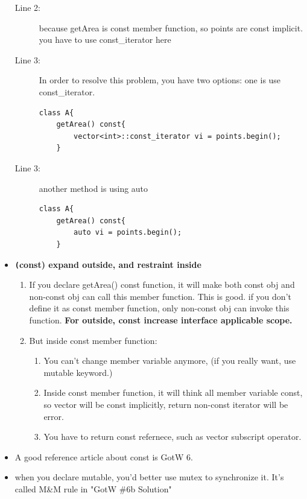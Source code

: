 \documentclass[a4paper,11pt,twoside]{book}
\begin{document}
\begin{itemize}
\begin{lstlisting}[frame=single, language=c++]
\end{lstlisting}

\begin{description}
	\item[Line 2:] because getArea is const member function, so points are const implicit. you have to use const\_iterator here
	
	\item[Line 3:] In order to resolve this problem, you have two options: one is use const\_iterator. 
\begin{lstlisting}[numbers=none]
class A{
	getArea() const{
		vector<int>::const_iterator vi = points.begin();
	}
\end{lstlisting}
	
	\item[Line 3:] another method is using auto
	
\begin{lstlisting}[numbers=none]
class A{
	getArea() const{
		auto vi = points.begin();
	}
\end{lstlisting}

\end{description}

	\item \textbf{\texttt(const) expand outside, and restraint inside}
	\begin{enumerate}
		\item If you declare getArea() const function, it will make both const obj and non-const obj can call this member function. This is good. if you don't define it as const member function, only non-const obj can invoke this function. \textbf{For outside, const increase interface applicable scope.}
		
		\item But inside const member function:
		\begin{enumerate}
				\item You can't change member variable anymore, (if you really want, use mutable keyword.) 
				\item Inside const member function, it will think all member variable const, so vector will be const implicitly, return non-const iterator will be error.
				\item You have to return const refernece, such as vector subscript operator. 
		\end{enumerate}
	\end{enumerate}

	\item A good reference article about const is GotW 6. 
	\item when you declare mutable, you'd better use mutex to synchronize it. It's called M\&M rule in "GotW \#6b Solution"
\end{itemize}
\end{document}

